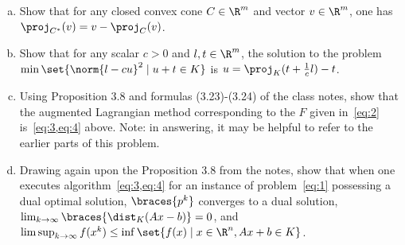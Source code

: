 \documentclass{article}
\theoremstyle{plain}
\theoremstyle{definition}
\theoremstyle{remark}
\begin{document}
\begin{problem}
\begin{enumerate}[(a)]
        \item Show that for any closed convex cone $C\in\R^m$ and vector $v\in\R^m$, one has $\proj_{C^*}(v)=v-\proj_C(v)$.
        \item Show that for any scalar $c>0$ and $l,t\in\R^m$, the solution to the problem $\min\set{\norm{l-cu}^2\mid u+t\in K}$ is $u=\proj_K(t+\frac{1}{c}l)-t$.
        \item Using Proposition 3.8 and formulas (3.23)-(3.24) of the class notes, show that the augmented Lagrangian method corresponding to the $F$ given in~\cref{eq:2} is~\cref{eq:3,eq:4} above. Note: in answering, it may be helpful to refer to the earlier parts of this problem.
        \item Drawing again upon the Proposition 3.8 from the notes, show that when one executes algorithm~\cref{eq:3,eq:4} for an instance of problem~\cref{eq:1} possessing a dual optimal solution, $\braces{p^k}$ converges to a dual solution, $\lim_{k\rightarrow\infty}\braces{\dist_K(Ax-b)}=0$, and $\lim\sup_{k\rightarrow\infty}f(x^k)\leq\inf\set{f(x)\mid x\in\R^n, Ax+b\in K}$.
    \end{enumerate}
\end{problem}
\end{document}
